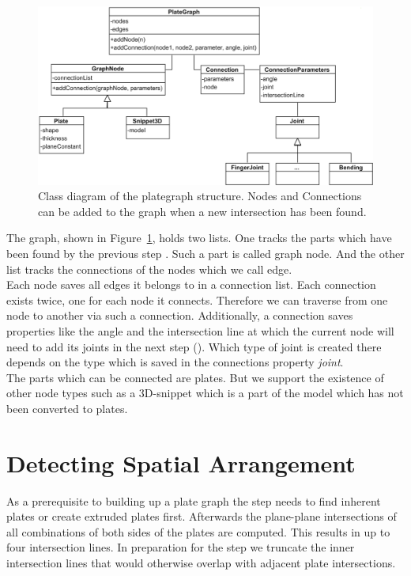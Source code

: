 \documentclass[../ClassicThesis.tex]{subfiles}
\begin{document}
\begin{figure}[!ht]
\centering
\includegraphics[width=1\columnwidth]{Images/GraphStructure.png}
\caption{Class diagram of the plategraph structure. Nodes and Connections can be added to the graph when a new intersection has been found.}
\label{fig:graphClassDiagram}
\end{figure}
The graph, shown in Figure~\ref{fig:graphClassDiagram}, holds two lists. One tracks the parts which have been found by the previous step . Such a part is called graph node. And the other list tracks the connections of the nodes which we call edge. \\
Each node saves all edges it belongs to in a connection list. Each connection exists twice, one for each node it connects. Therefore we can traverse from one node to another via such a connection. Additionally, a connection saves properties like the angle and the intersection line at which the current node will need to add its joints in the next step (). Which type of joint is created there depends on the type which is saved in the connections property \emph{joint}.\\
The parts which can be connected are plates. But we support the existence of other node types such as a 3D-snippet which is a part of the model which has not been converted to plates.

\section{Detecting Spatial Arrangement}
As a prerequisite to building up a plate graph the step  needs to find inherent plates or create extruded plates first. Afterwards the plane-plane intersections of all combinations of both sides of the plates are computed. This results in up to four intersection lines. In preparation for the step  we truncate the inner intersection lines that would otherwise overlap with adjacent plate intersections.
\end{document}
